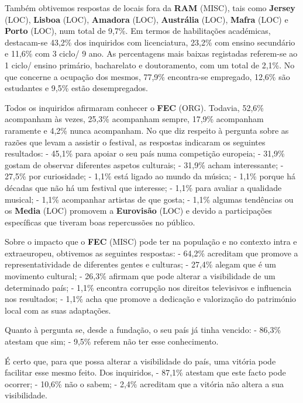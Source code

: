 \documentclass[12pt,a4paper]{article}
\begin{document}
Também obtivemos respostas de locais fora da \textbf{RAM} (MISC), tais como \textbf{Jersey} (LOC), \textbf{Lisboa} (LOC), \textbf{Amadora} (LOC), \textbf{Austrália} (LOC),  \textbf{Mafra} (LOC)  e  \textbf{Porto} (LOC),  num  total  de  9,7\%.  Em  termos  de  habilitações  académicas, destacam-se  43,2\%  dos  inquiridos  com  licenciatura,  23,2\%  com  ensino  secundário  e 11,6\%  com  3  ciclo/  9  ano.  As  percentagens  mais  baixas  registadas  referem-se  ao  1 ciclo/  ensino  primário,  bacharelato  e  doutoramento,  com  um  total  de  2,1\%.  No  que concerne a ocupação dos mesmos, 77,9\% encontra-se empregado, 12,6\% são estudantes e 9,5\% estão desempregados.

Todos os inquiridos afirmaram conhecer o \textbf{FEC} (ORG). Todavia, 52,6\% acompanham às vezes,  25,3\%  acompanham  sempre,  17,9\%  acompanham  raramente  e  4,2\%  nunca acompanham.  No  que  diz  respeito  à  pergunta  sobre  as  razões  que  levam  a  assistir  o festival, as respostas indicaram os seguintes resultados: - 45,1\% para apoiar o seu país numa competição europeia; - 31,9\% gostam de observar diferentes aspetos culturais; - 31,9\% acham interessante; - 27,5\% por curiosidade; - 1,1\% está ligado ao mundo da música; - 1,1\% porque há décadas que não há um festival que interesse; - 1,1\% para avaliar a qualidade musical; - 1,1\% acompanhar artistas de que gosta; - 1,1\% algumas tendências ou os \textbf{Media} (LOC) promovem a \textbf{Eurovisão} (LOC) e devido a participações específicas que tiveram boas repercussões no público.

Sobre  o  impacto  que  o  \textbf{FEC} (MISC)  pode  ter  na  população  e  no  contexto  intra  e extraeuropeu, obtivemos as seguintes respostas: - 64,2\% acreditam que promove a representatividade de diferentes gentes e culturas; - 27,4\% alegam que é um movimento cultural; - 26,3\% afirmam que pode alterar a visibilidade de um determinado país; - 1,1\% encontra corrupção nos direitos televisivos e influencia nos resultados; -  1,1\%  acha  que  promove  a  dedicação  e  valorização  do  património  local  com  as  suas adaptações.

Quanto à pergunta se, desde a fundação, o seu país já tinha vencido: - 86,3\% atestam que sim; - 9,5\% referem não ter esse conhecimento.

É certo que, para que possa alterar a visibilidade do país, uma vitória pode facilitar esse mesmo feito. Dos inquiridos, - 87,1\% atestam que este facto pode ocorrer; - 10,6\% não o sabem; - 2,4\% acreditam que a vitória não altera a sua visibilidade.
\end{document}
